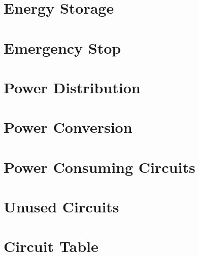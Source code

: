     \clearpage %


\section{Energy Storage}

\section{Emergency Stop}

\section{Power Distribution}

\section{Power Conversion}

\section{Power Consuming Circuits}

\section{Unused Circuits}

\section{Circuit Table}

